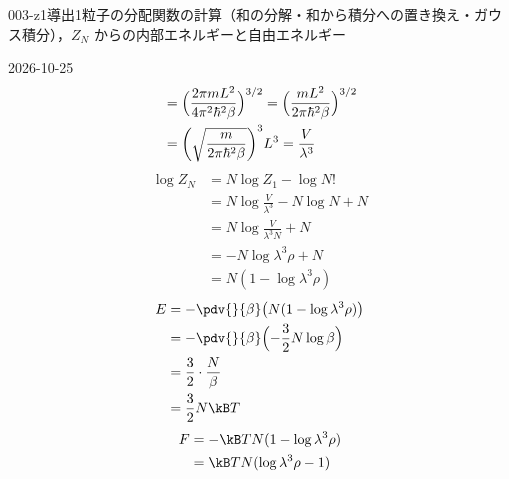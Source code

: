 \documentclass[uplatex,dvipdfmx,a4paper,11pt]{jsarticle}
\begin{document}
\begin{mondai}{003-z1}{導出}{1粒子の分配関数の計算（和の分解・和から積分への置き換え・ガウス積分），$Z_N$ からの内部エネルギーと自由エネルギー}
\begin{kotaeutsushi}{2026-10-25}
\begin{align*}
&=\Bigl(\frac{2\pi mL^{2}}{4\pi^{2}\hbar^{2}\beta}\Bigr)^{3/2}=\Bigl(\frac{mL^{2}}{2\pi\hbar^{2}\beta}\Bigr)^{3/2}\\
&=\biggl(\sqrt{\frac{m}{2\pi\hbar^{2}\beta}}\biggr)^{3}L^{3}=\frac{V}{\lambda^{3}}
\end{align*}
\begin{align*}
\log Z_N&=N\log Z_1-\log N!\\
&=N\log\frac{V}{\lambda^{3}}-N\log N+N\\
&=N\log\frac{V}{\lambda^{3}N}+N\\
&=-N\log\lambda^{3}\rho+N\\
&=N(1-\log\lambda^{3}\rho)
\end{align*}
\begin{align*}
E&=-\pdv{}{\beta}\bigl(N(1-\log\lambda^{3}\rho)\bigr)\\
&=-\pdv{}{\beta}\Bigl(-\frac{3}{2}N\log\beta\Bigr)\\
&=\frac{3}{2}\cdot\frac{N}{\beta}\\
&=\frac{3}{2}N\kB T
\end{align*}
\begin{align*}
F&=-\kB TN(1-\log\lambda^{3}\rho)\\
&=\kB TN(\log\lambda^{3}\rho-1)
\end{align*}
\end{kotaeutsushi}
\end{mondai}
\end{document}
